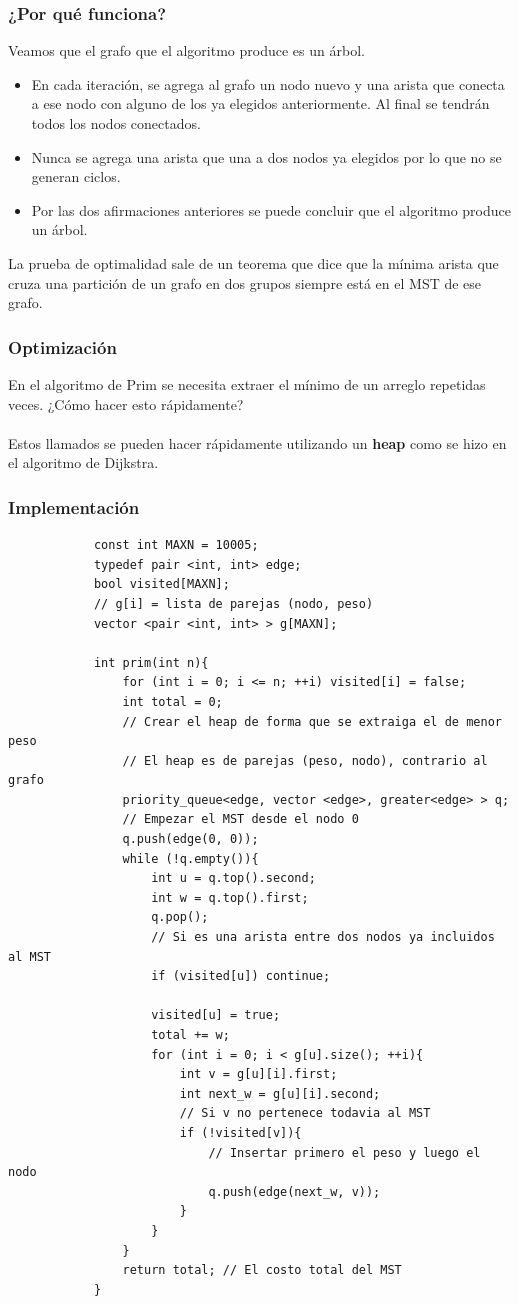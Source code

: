 \documentclass{beamer}
\begin{document}
	\begin{frame}
		\frametitle{¿Por qué funciona?}
		Veamos que el grafo que el algoritmo produce es un árbol.
		\begin{itemize}
			\item En cada iteración, se agrega al grafo un nodo nuevo y una arista que conecta a ese nodo con alguno de los ya elegidos anteriormente. Al final se tendrán todos los nodos conectados.
			\item Nunca se agrega una arista que una a dos nodos ya elegidos por lo que no se generan ciclos.
			\item Por las dos afirmaciones anteriores se puede concluir que el algoritmo produce un árbol.
		\end{itemize}
		La prueba de optimalidad sale de un teorema que dice que la mínima arista que cruza una partición de un grafo en dos grupos siempre está en el MST de ese grafo.
	\end{frame}
	
	\begin{frame}
		\frametitle{Optimización}
		En el algoritmo de Prim se necesita extraer el mínimo de un arreglo repetidas veces. ¿Cómo hacer esto rápidamente?\\ \quad \\
		\pause
		Estos llamados se pueden hacer rápidamente utilizando un \textbf{heap} como se hizo en el algoritmo de Dijkstra.
	\end{frame}
	
	\begin{frame}
		\frametitle{Implementación}
		\begin{lstlisting}
			const int MAXN = 10005;
			typedef pair <int, int> edge;
			bool visited[MAXN];
			// g[i] = lista de parejas (nodo, peso)
			vector <pair <int, int> > g[MAXN]; 

			int prim(int n){
			    for (int i = 0; i <= n; ++i) visited[i] = false;
			    int total = 0;
			    // Crear el heap de forma que se extraiga el de menor peso
			    // El heap es de parejas (peso, nodo), contrario al grafo
			    priority_queue<edge, vector <edge>, greater<edge> > q;
			    // Empezar el MST desde el nodo 0
			    q.push(edge(0, 0));
			    while (!q.empty()){
			        int u = q.top().second;
			        int w = q.top().first;
			        q.pop();
			        // Si es una arista entre dos nodos ya incluidos al MST
			        if (visited[u]) continue;

			        visited[u] = true;
			        total += w;
			        for (int i = 0; i < g[u].size(); ++i){
			            int v = g[u][i].first;
			            int next_w = g[u][i].second;
			            // Si v no pertenece todavia al MST
			            if (!visited[v]){
			                // Insertar primero el peso y luego el nodo
			                q.push(edge(next_w, v));    
			            }    
			        }
			    }
			    return total; // El costo total del MST
			}
		\end{lstlisting}
	\end{frame}
	
\end{document}

